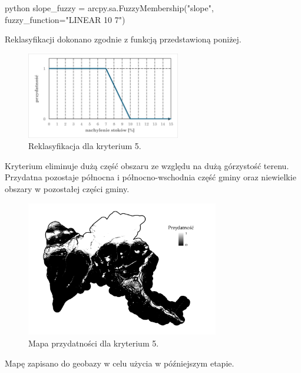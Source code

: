 \documentclass{article}
\begin{document}
\begin{mintedbox}{python}
slope_fuzzy = arcpy.sa.FuzzyMembership("slope", fuzzy_function="LINEAR 10 7")
\end{mintedbox}
\vspace{10pt}

Reklasyfikacji dokonano zgodnie z funkcją przedstawioną poniżej.
\vspace{5pt}

\begin{figure}[H]
    \centering
    \includegraphics[width=0.6\textwidth]{img/kryterium5-wykres-glowny.png}
    \caption{Reklasyfikacja dla kryterium 5.}
\end{figure}
\vspace{10pt}

Kryterium eliminuje dużą część obszaru ze względu na dużą górzystość terenu. Przydatna pozostaje północna i północno-wschodnia część gminy oraz niewielkie obszary w pozostałej części gminy.
\vspace{5pt}

\begin{figure}[H]
    \centering
    \includegraphics[width=0.75\textwidth]{img/kryterium5-layout.jpg}
    \caption{Mapa przydatności dla kryterium 5.}
\end{figure}
\vspace{10pt}

Mapę zapisano do geobazy w celu użycia w późniejszym etapie.
\vspace{5pt}
\end{document}
